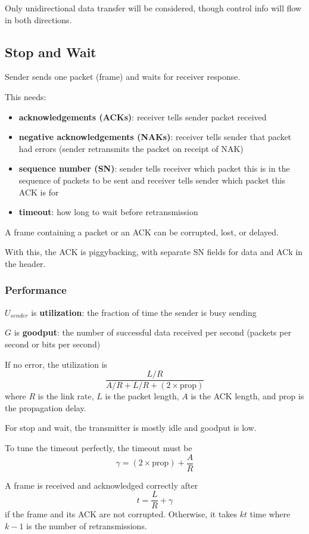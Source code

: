 \documentclass[11pt]{article}
\begin{document}
Only unidirectional data transfer will be considered, though control info will flow in both directions.
\subsection{Stop and Wait}
\label{sec:orgcd6d774}
Sender sends one packet (frame) and waits for receiver response.

This needs:
\begin{itemize}
\item \textbf{acknowledgements (ACKs)}: receiver tells sender packet received
\item \textbf{negative acknowledgements (NAKs)}: receiver tells sender that packet had errors (sender retransmits
the packet on receipt of NAK)
\item \textbf{sequence number (SN)}: sender tells receiver which packet this is in the sequence of packets to be sent
and receiver tells sender which packet this ACK is for
\item \textbf{timeout}: how long to wait before retransmission
\end{itemize}

A frame containing a packet or an ACK can be corrupted, lost, or delayed.

With this, the ACK is piggybacking, with separate SN fields for data and ACk in the header.
\subsubsection{Performance}
\label{sec:org8ac25f7}
\(U_{sender}\) is \textbf{utilization}: the fraction of time the sender is busy sending

\(G\) is \textbf{goodput}: the number of successful data received per second (packets per second or bits per second)

If no error, the utilization is
$$ \frac{L/R}{A/R + L/R + (2 \times \text{prop})} $$
where \(R\) is the link rate, \(L\) is the packet length, \(A\) is the ACK length, and \(\text{prop}\) is the
propagation delay.

For stop and wait, the transmitter is mostly idle and goodput is low.

To tune the timeout perfectly, the timeout must be
$$ \gamma = (2 \times \text{prop}) + \frac{A}{R} $$

A frame is received and acknowledged correctly after
$$ t = \frac{L}{R} + \gamma $$
if the frame and its ACK are not corrupted. Otherwise, it takes \(kt\) time where \(k-1\) is the number
of retransmissions.
\end{document}

